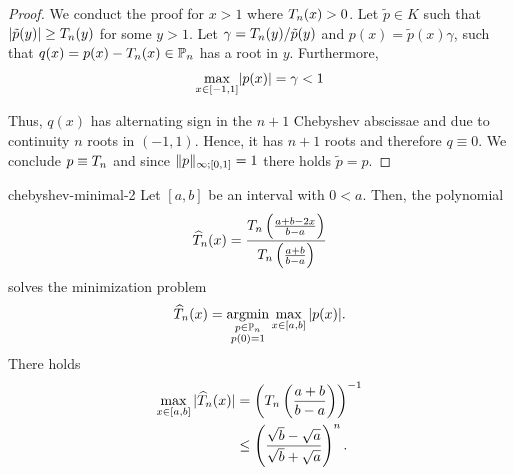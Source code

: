 \begin{proof}
  We conduct the proof for $x>1$ where $T_n(x) > 0$.
  Let $\tilde p\in K$ such that
  $\lvert\tilde p(y)\rvert \ge T_n(y)$ for some $y>1$. Let
  $\gamma = T_n(y)/\tilde p(y)$ and
  $p(x) = \tilde p(x)\gamma$, such that
  $q(x) = p(x) - T_n(x) \in \mathbb P_n$ has a root in $y$.
  Furthermore,
  \begin{gather}
    \max_{x\in[-1,1]} \lvert p(x)\rvert =\gamma < 1
  \end{gather}

  Thus, $q(x)$ has alternating sign in the $n+1$ Chebyshev abscissae and due to continuity $n$ roots in
  $(-1,1)$. Hence, it has $n+1$ roots and therefore
  $q \equiv 0$. We conclude $p \equiv T_n$ and since
  $\lVert p\rVert_{\infty;[0,1]} = 1$ there holds $\tilde p = p$.
\end{proof}

\begin{Corollary}{chebyshev-minimal-2}
  Let $[a,b]$ be an interval with $0 < a$. Then, the polynomial
  \begin{gather}
    \widehat \pchebyshev_n(x)
    = \frac{\pchebyshev_n\left(\frac{a+b-2x}{b-a}\right)}%
    {\pchebyshev_n\left(\frac{a+b}{b-a}\right)}
  \end{gather}
  solves the minimization problem
  \begin{gather}
    \widehat {T}_n(x)
    = \operatorname*{argmin}_{\substack{p\in\mathbb P_n\\p(0) = 1}}
    \max_{x\in[a,b]}{\lvert p(x)\rvert}.
  \end{gather}
  There holds
  \begin{align}
    \label{eq:chebyshev-cg1}
    \max_{x\in[a,b]}{\lvert\widehat {T}_n(x)\rvert}
    &= \left(T_n\left(\frac{a+b}{b-a}\right)\right)^{-1}\\
    & \le \left(\frac{\sqrt b-\sqrt a}{\sqrt b + \sqrt a}\right)^n.
  \end{align}
\end{Corollary}


